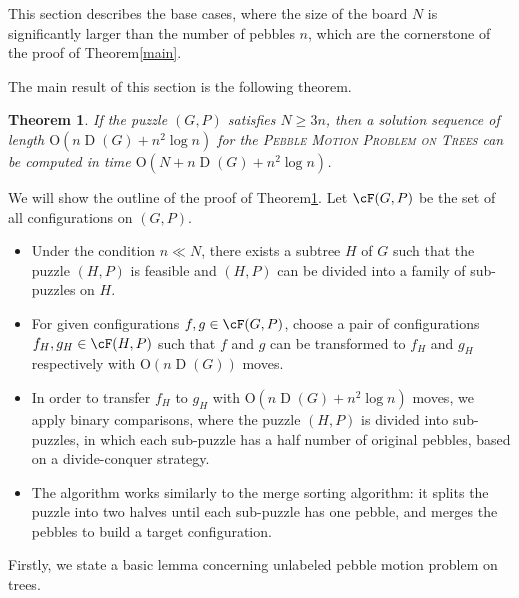 \documentclass[letter,11pt]{article}
\newtheorem{thm}{Theorem}
\theoremstyle{definition}
\theoremstyle{definition}
\DeclareMathOperator{\D}{D}
\newcommand{\1}{\boldmath$~1~$\unboldmath}
\newcommand{\Ord}{\mathrm{O}}
\newcommand{\tume}{\hspace*{0.2em}}
\begin{document}
This section describes the base cases, where the size of the board $N$ is significantly larger than the number of pebbles $n$, which are the cornerstone of the proof of Theorem\tume\ref{main}.


The main result of this section is the following theorem.

\begin{thm}\label{sbs3}
If the puzzle $(G, P)$ satisfies $N \ge 3n$, then a solution sequence of length $\Ord (n\D(G) + n^2 \log n)$ for the \textsc{Pebble Motion Problem on Trees} can be computed in time $\Ord (N + n\D(G) + n^2 \log n)$.
\end{thm}

We will show the outline of the proof of Theorem\tume\ref{sbs3}.
Let $\cF(G, P)$ be the set of all configurations on $(G, P)$.
\begin{itemize}
\item Under the condition $n \ll N$, there exists a subtree $H$ of $G$ such that the puzzle $(H, P)$ is feasible and $(H, P)$ can be divided into a family of sub-puzzles on $H$.  
\item For given configurations $f, g \in \cF(G, P)$, choose a pair of configurations $f_H, g_H \in \cF(H, P)$ such that $f$ and $g$ can be transformed to $f_H$ and $g_H$ respectively with $\Ord (n\D(G))$ moves.
\item In order to transfer $f_H$ to $g_H$ with $\Ord (n\D(G) + n^2 \log n)$ moves, we apply binary comparisons, where the puzzle $(H, P)$ is divided into sub-puzzles, in which each sub-puzzle has a half number of original pebbles, based on a divide-conquer strategy. 
\item The algorithm works similarly to the merge sorting algorithm:
 it splits the puzzle into two halves until each sub-puzzle has one pebble, and merges the pebbles to build a target configuration.  
\end{itemize}

Firstly, we state a basic lemma concerning unlabeled pebble motion problem on trees.
\end{document}
